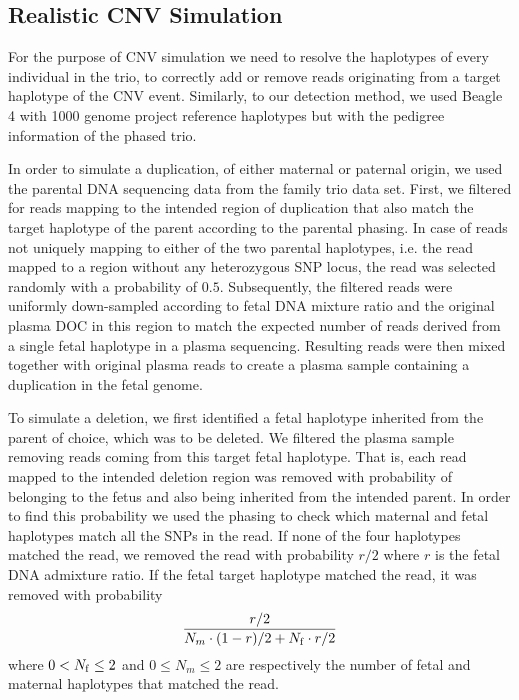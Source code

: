 \subsection{Realistic CNV Simulation}\label{ss:simulation}
For the purpose of CNV simulation we need to resolve the haplotypes of every individual in the trio, to correctly add or remove reads originating from a target haplotype of the CNV event. Similarly, to our detection method, we used Beagle 4 with 1000 genome project reference haplotypes but with the pedigree information of the phased trio.

	In order to simulate a duplication, of either maternal or paternal origin, we used the parental DNA sequencing data from the family trio data set. First, we filtered for reads mapping to the intended region of duplication that also match the target haplotype of the parent according to the parental phasing. In case of reads not uniquely mapping to either of the two parental haplotypes, i.e. the read mapped to a region without any heterozygous SNP locus, the read was selected randomly with a probability of $0.5$. Subsequently, the filtered reads were uniformly down-sampled according to fetal DNA mixture ratio and the original plasma DOC in this region to match the expected number of reads derived from a single fetal haplotype in a plasma sequencing. Resulting reads were then mixed together with original plasma reads to create a plasma sample containing a duplication in the fetal genome.
	
	To simulate a deletion, we first identified a fetal haplotype inherited from the parent of choice, which was to be deleted. We filtered the plasma sample removing reads coming from this target fetal haplotype. That is, each read mapped to the intended deletion region was removed with probability of belonging to the fetus and also being inherited from the intended parent. In order to find this probability we used the phasing to check which maternal and fetal haplotypes match all the SNPs in the read.  If none of the four haplotypes matched the read, we removed the read with probability $r/2$ where $r$ is the fetal DNA admixture ratio. If the fetal target haplotype matched the read, it was removed with probability
\begin{align*}
\frac{ r/2 } { N_m \cdot (1-r)/2 + N_{\mathrm{f}} \cdot r/2}
\end{align*}
where $0 < N_{\mathrm{f}} \leq 2$ and $0 \leq N_m \leq 2$ are respectively the number of fetal and maternal haplotypes that matched the read.
	
